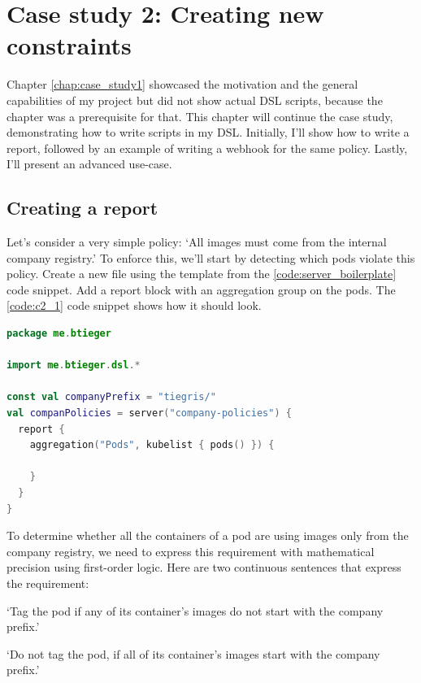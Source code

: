 \chapter{Case study 2: Creating new constraints}
\label{chap:case_study2}

Chapter \ref{chap:case_study1} showcased the motivation and the general capabilities of my project but did not show actual DSL scripts, because the  chapter was a prerequisite for that. This chapter will continue the case study, demonstrating how to write scripts in my DSL. Initially, I'll show how to write a report, followed by an example of writing a webhook for the same policy. Lastly, I'll present an advanced use-case.

\section{Creating a report}

Let's consider a very simple policy: `All images must come from the internal company registry.' To enforce this, we'll start by detecting which pods violate this policy. Create a new file using the template from the \ref{code:server_boilerplate} code snippet. Add a report block with an aggregation group on the pods. The \ref{code:c2_1} code snippet shows how it should look.

\begin{minipage}{\linewidth}
\begin{lstlisting}[caption={Report skeleton},language=Kotlin,label=code:c2_1]
package me.btieger

import me.btieger.dsl.*

const val companyPrefix = "tiegris/"
val companPolicies = server("company-policies") {
  report {
    aggregation("Pods", kubelist { pods() }) {
  
    }
  }
}
\end{lstlisting}
\end{minipage}

To determine whether all the containers of a pod are using images only from the company registry, we need to express this requirement with mathematical precision using first-order logic. Here are two continuous sentences that express the requirement:

`Tag the pod if any of its container's images do not start with the company prefix.'

`Do not tag the pod, if all of its container's images start with the company prefix.'

